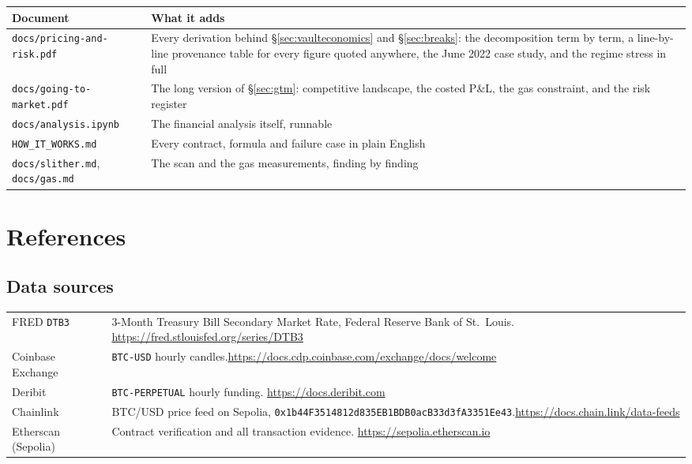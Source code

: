 \documentclass[11pt,a4paper]{article}
\begin{document}
\begin{center}
\small
\begin{tabular}{@{}p{4.8cm}p{10.4cm}@{}}
\toprule
\textbf{Document} & \textbf{What it adds} \\
\midrule
\texttt{docs/pricing-and-risk.pdf} & Every derivation behind \S\ref{sec:vaulteconomics} and \S\ref{sec:breaks}: the decomposition term by term, a line-by-line provenance table for every figure quoted anywhere, the June 2022 case study, and the regime stress in full \\
\texttt{docs/going-to-market.pdf} & The long version of \S\ref{sec:gtm}: competitive landscape, the costed P\&L, the gas constraint, and the risk register \\
\texttt{docs/analysis.ipynb} & The financial analysis itself, runnable \\
\texttt{HOW\_IT\_WORKS.md} & Every contract, formula and failure case in plain English \\
\texttt{docs/slither.md}, \texttt{docs/gas.md} & The scan and the gas measurements, finding by finding \\
\bottomrule
\end{tabular}
\end{center}

\section{References}\label{app:refs}

\subsection*{Data sources}

\begin{center}
\small
\begin{tabular}{@{}p{3.6cm}p{11.4cm}@{}}
\toprule
FRED \texttt{DTB3} & 3-Month Treasury Bill Secondary Market Rate, Federal Reserve Bank of St.\ Louis. \url{https://fred.stlouisfed.org/series/DTB3} \\
Coinbase Exchange & \texttt{BTC-USD} hourly candles.\newline\url{https://docs.cdp.coinbase.com/exchange/docs/welcome} \\
Deribit & \texttt{BTC-PERPETUAL} hourly funding. \url{https://docs.deribit.com} \\
Chainlink & BTC/USD price feed on Sepolia, \nolinkurl{0x1b44F3514812d835EB1BDB0acB33d3fA3351Ee43}.\newline\url{https://docs.chain.link/data-feeds} \\
Etherscan (Sepolia) & Contract verification and all transaction evidence. \url{https://sepolia.etherscan.io} \\
\bottomrule
\end{tabular}
\end{center}
\end{document}
